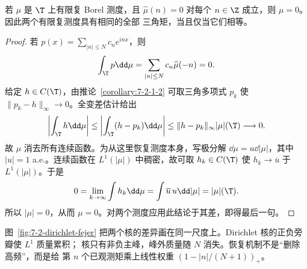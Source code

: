 \begin{proposition}\label{proposition:7-2-1-4}
若 $\mu$ 是 $\T$ 上有限复 Borel 测度，且
$\widehat\mu(n)=0$ 对每个 $n\in\Z$ 成立，则 $\mu=0$。因此两个有限复测度具有相同的全部
三角矩，当且仅当它们相等。
\end{proposition}

\begin{proof}
若 $p(x)=\sum_{|n|\leq N}c_ne^{inx}$，则
\[
 \int_\T p\dd\mu=\sum_{|n|\leq N}c_n\widehat\mu(-n)=0.
\]
给定 $h\in C(\T)$，由推论~\ref{corollary:7-2-1-2} 可取三角多项式 $p_k$ 使
$\|p_k-h\|_\infty\to0$。全变差估计给出
\[
 \left|\int_\T h\dd\mu\right|
 \leq\left|\int_\T(h-p_k)\dd\mu\right|
 \leq\|h-p_k\|_\infty |\mu|(\T)\longrightarrow0.
\]
故 $\mu$ 消去所有连续函数。为从这里恢复测度本身，写极分解
$\dd\mu=u\dd|\mu|$，其中 $|u|=1$ a.e.。连续函数在
$L^1(|\mu|)$ 中稠密，故可取 $h_k\in C(\T)$ 使
$h_k\to\overline u$ 于 $L^1(|\mu|)$。于是
\[
 0=\lim_{k\to\infty}\int h_k\dd\mu
  =\int\overline u\,u\dd|\mu|=|\mu|(\T).
\]
所以 $|\mu|=0$，从而 $\mu=0$。对两个测度应用此结论于其差，即得最后一句。
\end{proof}

图~\ref{fig:7-2-dirichlet-fejer} 把两个核的差异画在同一尺度上。Dirichlet 核的正负旁瓣使
$L^1$ 质量累积；\Fejer{} 核只有非负主峰，峰外质量随 $N$ 消失。恢复机制不是“删除高频”，而是给
第 $n$ 个已观测矩乘上线性权重 $(1-|n|/(N+1))_+$。


